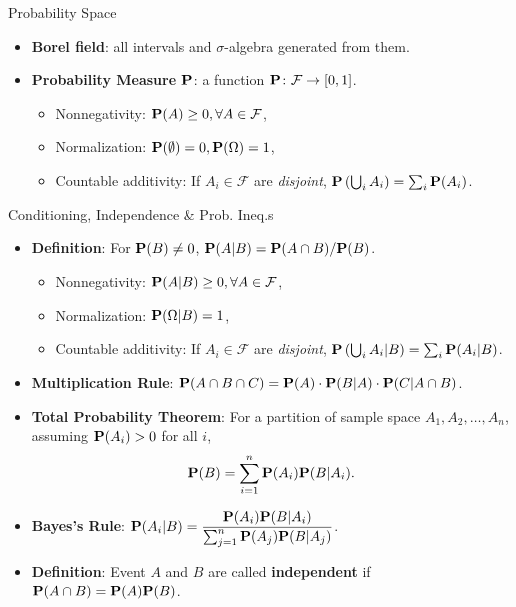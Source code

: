 \documentclass[landscape,a4paper]{article}
\begin{document}
\begin{cheatsheetcolumns}
\begin{card}{Probability Space}
\begin{itemize}
\begin{itemize}
				\end{itemize}
				\item \textbf{Borel field}: all intervals and $\sigma$-algebra generated from them.
				\item \textbf{Probability Measure $\mathbf{P}$}: a function $\mathbf{P} \colon \mathcal F\to [0,1]$.
				\begin{itemize}
					\item Nonnegativity: $\mathbf{P}(A)\ge 0,\forall A\in\mathcal F$,
					\item Normalization: $\mathbf{P}(\emptyset)=0,\mathbf{P}(\Omega)=1$,
					\item Countable additivity: If $A_i\in\mathcal F$ are \textit{disjoint}, $\mathbf{P}\left(\bigcup_i A_i\right)=\sum_i\mathbf{P}(A_i)$.
				\end{itemize}
			\end{itemize}
		\end{card}
		\begin{card}{Conditioning, Independence \& Prob. Ineq.s}
			\begin{itemize}
				\item \textbf{Definition}: For $\mathbf{P}(B)\neq 0$, $\mathbf{P}(A|B)=\mathbf{P}(A\cap B)/\mathbf{P}(B)$.
				\begin{itemize}
					\item Nonnegativity: $\mathbf{P}(A|B)\ge 0,\forall A\in\mathcal F$,
					\item Normalization: $\mathbf{P}(\Omega|B)=1$,
					\item Countable additivity: If $A_i\in\mathcal F$ are \textit{disjoint}, $\mathbf{P}\left(\bigcup_i A_i|B\right)=\sum_i\mathbf{P}(A_i|B)$.
				\end{itemize}
				\item \textbf{Multiplication Rule}: $\mathbf{P}(A\cap B\cap C)=\mathbf{P}(A)\cdot\mathbf{P}(B|A)\cdot\mathbf{P}(C|A\cap B)$.
				\item \textbf{Total Probability Theorem}: For a partition of sample space $A_1, A_2,\dots, A_n$, assuming $\mathbf{P}(A_i)>0$ for all $i$,
				\[
				\mathbf{P}(B)=\sum_{i=1}^n \mathbf{P}(A_i)\mathbf{P}(B|A_i).
				\]
				\item \textbf{Bayes's Rule}: $\mathbf{P}(A_i|B)=\dfrac{\mathbf{P}(A_i)\mathbf{P}(B|A_i)}{\sum_{j=1}^n\mathbf{P}(A_j)\mathbf{P}(B|A_j)}$.
			\end{itemize}
			\begin{itemize}
			\item \textbf{Definition}: Event $A$ and $B$ are called \textbf{independent} if $\mathbf{P}(A\cap B)=\mathbf{P}(A)\mathbf{P}(B)$.

\end{itemize}
\end{card}
\end{cheatsheetcolumns}
\end{document}
